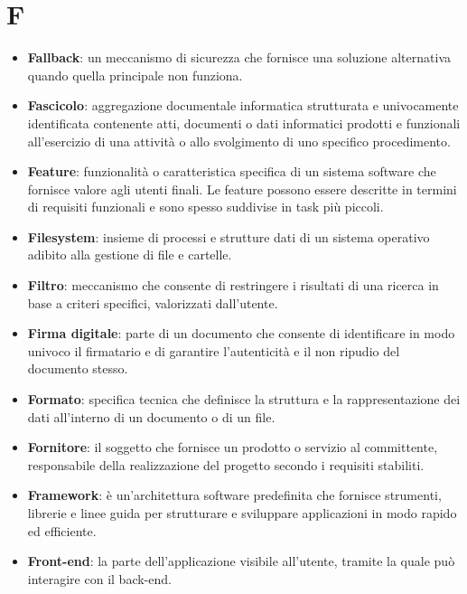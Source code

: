 \documentclass[a4paper,12pt]{article}
\begin{document}
\section{F}
\begin{itemize}
    \item \textbf{Fallback}: un meccanismo di sicurezza che fornisce una soluzione alternativa quando quella principale non funziona.
    \item \textbf{Fascicolo}: aggregazione documentale informatica strutturata e univocamente identificata contenente atti, documenti o dati informatici prodotti e funzionali all'esercizio di una attività o allo svolgimento di uno specifico procedimento.
    \item \textbf{Feature}: funzionalità o caratteristica specifica di un sistema software che fornisce valore agli utenti finali. Le feature possono essere descritte in termini di requisiti funzionali e sono spesso suddivise in task più piccoli.
    \item \textbf{Filesystem}: insieme di processi e strutture dati di un sistema operativo adibito alla gestione di file e cartelle.
    \item \textbf{Filtro}: meccanismo che consente di restringere i risultati di una ricerca in base a criteri specifici, valorizzati dall'utente.
    \item \textbf{Firma digitale}: parte di un documento che consente di identificare in modo univoco il firmatario e di garantire l'autenticità e il non ripudio del documento stesso.
    \item \textbf{Formato}: specifica tecnica che definisce la struttura e la rappresentazione dei dati all'interno di un documento o di un file.
    \item \textbf{Fornitore}: il soggetto che fornisce un prodotto o servizio al committente, responsabile della realizzazione del progetto secondo i requisiti stabiliti.
    \item \textbf{Framework}: è un'architettura software predefinita che fornisce strumenti, librerie e linee guida per strutturare e sviluppare applicazioni in modo rapido ed efficiente.
    \item \textbf{Front-end}: la parte dell'applicazione visibile all'utente, tramite la quale può interagire con il back-end.
\end{itemize}
\end{document}

